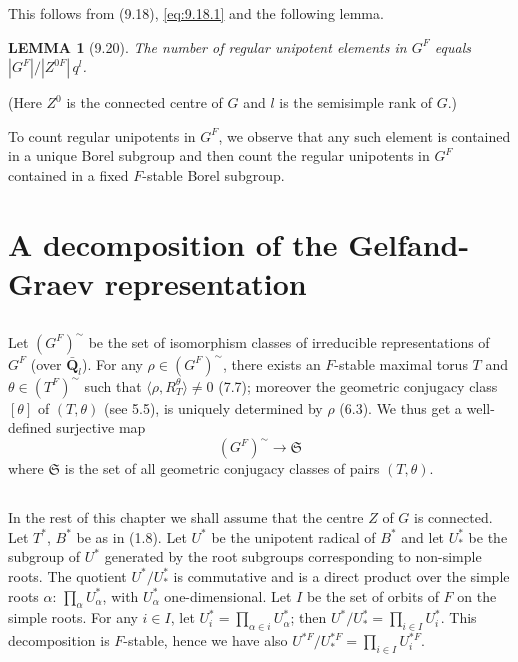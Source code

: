 \documentclass{amsart}
\theoremstyle{plain}
\newtheorem{lemma}[theorem]{LEMMA}
\theoremstyle{remark}
\begin{document}
This follows from (9.18), \eqref{eq:9.18.1} and the following lemma.

\begin{lemma}[9.20]
The number of regular unipotent elements in $G^F$ equals $|G^F|/|Z^{0F}|\, q^l$.
\end{lemma}

(Here $Z^0$ is the connected centre of $G$ and $l$ is the semisimple rank of $G$.)

To count regular unipotents in $G^F$, we observe that any such element is contained in a unique Borel subgroup and then count the regular unipotents in $G^F$ contained in a fixed $F$-stable Borel subgroup.

\section{A decomposition of the Gelfand-Graev representation}

\subsection{}
Let $(G^F)^{\sim}$ be the set of isomorphism classes of irreducible representations of $G^F$ (over $\bar{\mathbf{Q}}_l$). For any $\rho \in (G^F)^{\sim}$, there exists an $F$-stable maximal torus $T$ and $\theta \in (T^F)^{\sim}$ such that $\langle \rho, R_T^\theta \rangle \neq 0$ (7.7); moreover the geometric conjugacy class $[\theta]$ of $(T, \theta)$ (see 5.5), is uniquely determined by $\rho$ (6.3). We thus get a well-defined surjective map
\begin{equation}\label{eq:10.1.1}
(G^F)^{\sim} \longrightarrow \mathfrak{S}
\end{equation}
where $\mathfrak{S}$ is the set of all geometric conjugacy classes of pairs $(T, \theta)$.

\subsection{}
In the rest of this chapter we shall assume that the centre $Z$ of $G$ is connected. Let $T^*$, $B^*$ be as in (1.8). Let $U^*$ be the unipotent radical of $B^*$ and let $U_*^*$ be the subgroup of $U^*$ generated by the root subgroups corresponding to non-simple roots. The quotient $U^*/U_*^*$ is commutative and is a direct product over the simple roots $\alpha$: $\prod_\alpha U_\alpha^*$, with $U_\alpha^*$ one-dimensional. Let $I$ be the set of orbits of $F$ on the simple roots. For any $i \in I$, let $U_i^* = \prod_{\alpha \in i} U_\alpha^*$; then $U^*/U_*^* = \prod_{i \in I} U_i^*$. This decomposition is $F$-stable, hence we have also $U^{*F}/U_*^{*F} = \prod_{i \in I} U_i^{*F}$.
\end{document}
